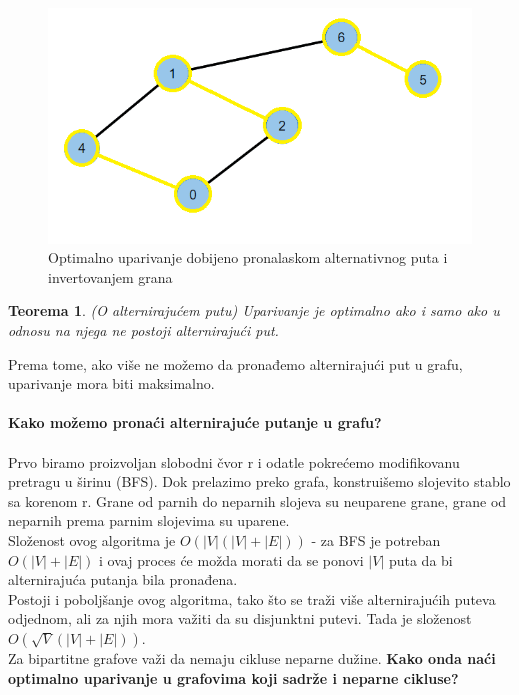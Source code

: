 \documentclass[a4paper]{article}
\theoremstyle{definition}
\newtheorem{teorema}{Teorema}
\begin{document}
\begin{figure}[H]
\begin{center}
\includegraphics[scale=0.7]{Graf 2 - optimalan.png}
\end{center}
\caption{Optimalno uparivanje dobijeno pronalaskom alternativnog puta i invertovanjem grana}
\label{graf 2 optimalan}
\end{figure}


\begin{teorema}
\textsl{(O alternirajućem putu) Uparivanje je optimalno ako i samo ako u odnosu na njega ne postoji alternirajući put.}
\end{teorema}
 Prema tome, ako više ne možemo da pronađemo alternirajući put u grafu, uparivanje mora biti maksimalno.\\ \\
\textbf{Kako možemo pronaći alternirajuće putanje u grafu?} \\ \\ Prvo biramo proizvoljan slobodni čvor r i odatle pokrećemo modifikovanu pretragu u širinu (BFS). Dok prelazimo preko grafa, konstruišemo slojevito stablo sa korenom r. Grane od parnih do neparnih slojeva su neuparene grane, grane od neparnih prema parnim slojevima su uparene.\\
 Složenost ovog algoritma je $O(|V|(|V|+|E|))$ - za BFS je potreban $O(|V|+|E|)$ i ovaj proces će možda morati da se ponovi $|V|$ puta da bi alternirajuća putanja bila pronađena.\\ Postoji i poboljšanje ovog algoritma, tako što se traži više alternirajućih puteva odjednom, ali za njih mora važiti da su disjunktni putevi. Tada je složenost $O(\sqrt{V}(|V|+|E|))$.\\

Za bipartitne grafove važi da nemaju cikluse neparne dužine. \textbf{Kako onda naći optimalno uparivanje u grafovima koji sadrže i neparne cikluse?}
\newpage
\end{document}

